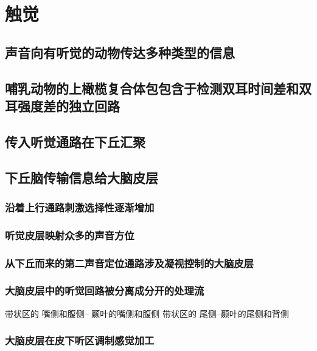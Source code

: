 \chapter{触觉}

\section{声音向有听觉的动物传达多种类型的信息}

\section{哺乳动物的上橄榄复合体包包含于检测双耳时间差和双耳强度差的独立回路}

\section{传入听觉通路在下丘汇聚}


\section{下丘脑传输信息给大脑皮层}

\subsection{沿着上行通路刺激选择性逐渐增加}

\subsection{听觉皮层映射众多的声音方位}

\subsection{从下丘而来的第二声音定位通路涉及凝视控制的大脑皮层}


\subsection{大脑皮层中的听觉回路被分离成分开的处理流}
带状区的 嘴侧和腹侧-- 颞叶的嘴侧和腹侧
带状区的 尾侧--颞叶的尾侧和背侧

\subsection{大脑皮层在皮下听区调制感觉加工}


